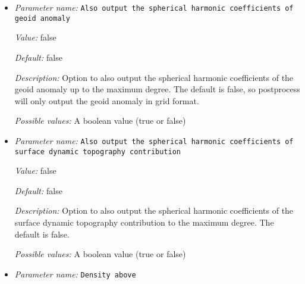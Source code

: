 \begin{itemize}
{\it Default:} false


{\it Description:} Option to also output the spherical harmonic coefficients of the density anomaly contribution to the maximum degree. The default is false. 


{\it Possible values:} A boolean value (true or false)
\item {\it Parameter name:} {\tt Also output the spherical harmonic coefficients of geoid anomaly}
\label{parameters:Postprocess/Geoid/Also output the spherical harmonic coefficients of geoid anomaly}
\label{parameters:Postprocess/Geoid/Also_20output_20the_20spherical_20harmonic_20coefficients_20of_20geoid_20anomaly}


{\it Value:} false


{\it Default:} false


{\it Description:} Option to also output the spherical harmonic coefficients of the geoid anomaly up to the maximum degree. The default is false, so postprocess will only output the geoid anomaly in grid format. 


{\it Possible values:} A boolean value (true or false)
\item {\it Parameter name:} {\tt Also output the spherical harmonic coefficients of surface dynamic topography contribution}
\label{parameters:Postprocess/Geoid/Also output the spherical harmonic coefficients of surface dynamic topography contribution}
\label{parameters:Postprocess/Geoid/Also_20output_20the_20spherical_20harmonic_20coefficients_20of_20surface_20dynamic_20topography_20contribution}


{\it Value:} false


{\it Default:} false


{\it Description:} Option to also output the spherical harmonic coefficients of the surface dynamic topography contribution to the maximum degree. The default is false. 


{\it Possible values:} A boolean value (true or false)
\item {\it Parameter name:} {\tt Density above}
\label{parameters:Postprocess/Geoid/Density above}
\label{parameters:Postprocess/Geoid/Density_20above}



\end{itemize}
